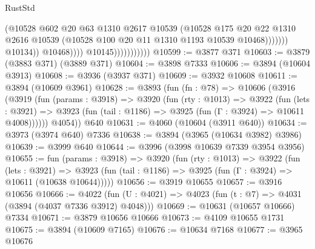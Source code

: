 \begin{lexlean}{RustStd}
\begin{coremodule}
                                              (@10528
                                                @602
                                                @20
                                                @63
                                                @1310
                                                @2617
                                                @10539
                                                (@10528
                                                  @175
                                                  @20
                                                  @22
                                                  @1310
                                                  @2616
                                                  @10539
                                                  (@10528
                                                    @100
                                                    @20
                                                    @11
                                                    @1310
                                                    @1193
                                                    @10539
                                                    @10468)))))))
                                      @10134))
                                  @10468))))
                          @10145)))))))))))
@10599 := @3877 @371
@10603 := @3879 (@3883 @371) (@3889 @371)
@10604 := @3898 @7333
@10606 := @3894 (@10604 @3913)
@10608 := @3936 (@3937 @371)
@10609 := @3932 @10608
@10611 := @3894 (@10609 @3961)
@10628 := @3893
    (fun (fn : @78) =>
    @10606
      (@3916
        (@3919
          (fun (params : @3918) =>
          @3920
            (fun (rty : @1013) =>
            @3922
              (fun (lets : @3921) =>
              @3923 (fun (tail : @1186) => @3925 (fun (Γ : @3924) => @10611 @4008))))))
        @4054))
    @640
@10631 := @4060 (@10604 (@3911 @640))
@10634 := @3973 (@3974 @640) @7336
@10638 := @3894 (@3965 (@10634 @3982) @3986)
@10639 := @3999 @640
@10644 := @3996 (@3998 @10639 @7339 @3954 @3956)
@10655 := fun (params : @3918) =>
  @3920
    (fun (rty : @1013) =>
    @3922
      (fun (lets : @3921) =>
      @3923 (fun (tail : @1186) => @3925 (fun (Γ : @3924) => @10611 (@10638 @10644)))))
@10656 := @3919 @10655
@10657 := @3916 @10656
@10666 := @4022 (fun (U : @4021) => @4023 (fun (t : @7) => @4031 (@3894 (@4037 @7336 @3912) @4048)))
@10669 := @10631 (@10657 @10666) @7334
@10671 := @3879 @10656 @10666
@10673 := @4109 @10655 @1731
@10675 := @3894 (@10609 @7165)
@10676 := @10634 @7168
@10677 := @3965 @10676

\end{coremodule}
\end{lexlean}
